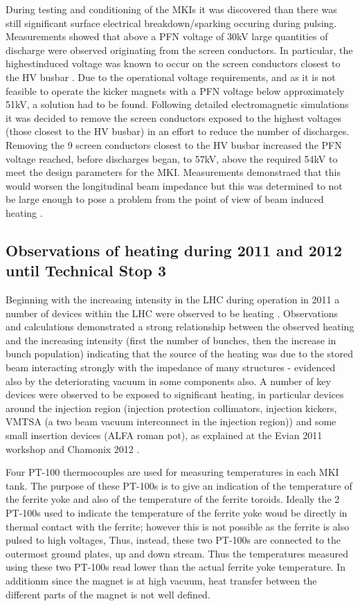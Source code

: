 During testing and conditioning of the MKIs it was discovered than there was still significant surface electrical breakdown/sparking occuring during pulsing. Measurements showed that above a PFN voltage of 30kV large quantities of discharge were observed originating from the screen conductors. In particular, the highestinduced  voltage was known to occur on the screen conductors closest to the HV busbar \cite{Barnes:improvBeamScreen}. Due to the operational voltage requirements, and as it is not feasible to operate the kicker magnets with a PFN voltage below approximately 51kV, a solution had to be found. Following detailed electromagnetic simulations it was decided to remove the screen conductors exposed to the highest voltages (those closest to the HV busbar) in an effort to reduce the number of discharges. Removing the 9 screen conductors closest to the HV busbar increased the PFN voltage reached, before discharges began, to 57kV, above the required 54kV to meet the design parameters for the MKI. Measurements demonstraed that this would worsen the longitudinal beam impedance but this was determined to not be large enough to pose a problem from the point of view of beam induced heating \cite{Barnes:improvBeamScreen}.

\subsection{Observations of heating during 2011 and 2012 until Technical Stop 3}

Beginning with the increasing intensity in the LHC during operation in 2011 a number of devices within the LHC were observed to be heating \cite{ Salvant:Heating, Metral:Heating}. Observations and calculations demonstrated a strong relationship between the observed heating and the increasing intensity (first the number of bunches, then the increase in bunch population) indicating that the source of the heating was due to the stored beam interacting strongly with the impedance of many structures - evidenced also by the deteriorating vacuum in some components also. A number of key devices were observed to be exposed to significant heating, in particular devices around the injection region (injection protection collimators, injection kickers, VMTSA (a two beam vacuum interconnect in the injection region)) and some small insertion devices (ALFA roman pot), as explained at the Evian 2011 workshop \cite{Salvant:Heating} and Chamonix 2012 \cite{Metral:Heating}. 

Four PT-100 thermocouples are used for measuring temperatures in each MKI tank. The purpose of these PT-100s is to give an indication of the temperature of the ferrite yoke and also of the temperature of the ferrite toroids. Ideally the 2 PT-100s used to indicate the temperature of the ferrite yoke woud be directly in thermal contact with the ferrite; however this is not possible as the ferrite is also pulsed to high voltages, Thus, instead, these two PT-100s are connected to the outermost ground plates, up and down stream. Thus the temperatures measured using these two PT-100s read lower than the actual ferrite yoke temperature. In additionm since the magnet is at high vacuum, heat transfer between the different parts of the magnet is not well defined.

